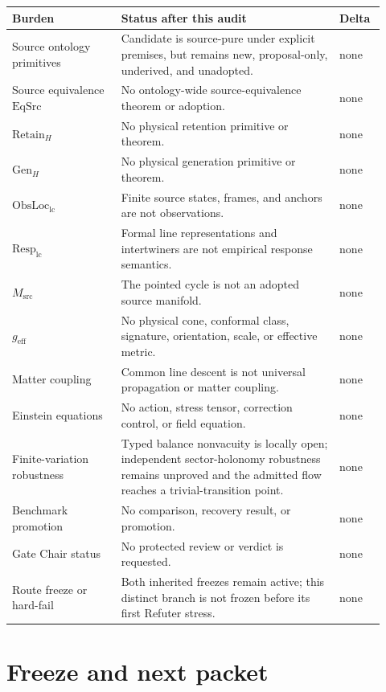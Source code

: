 \documentclass[11pt]{article}
\begin{document}
\small
\begin{longtable}{@{}p{0.27\linewidth}p{0.54\linewidth}p{0.11\linewidth}@{}}
\toprule
Burden & Status after this audit & Delta\\
\midrule
\endhead
Source ontology primitives & Candidate is source-pure under explicit premises, but remains new, proposal-only, underived, and unadopted. & none\\
Source equivalence $\mathrm{EqSrc}$ & No ontology-wide source-equivalence theorem or adoption. & none\\
$\mathrm{Retain}_H$ & No physical retention primitive or theorem. & none\\
$\mathrm{Gen}_H$ & No physical generation primitive or theorem. & none\\
$\mathrm{ObsLoc}_{\mathrm{lc}}$ & Finite source states, frames, and anchors are not observations. & none\\
$\mathrm{Resp}_{\mathrm{lc}}$ & Formal line representations and intertwiners are not empirical response semantics. & none\\
$M_{\mathrm{src}}$ & The pointed cycle is not an adopted source manifold. & none\\
$g_{\mathrm{eff}}$ & No physical cone, conformal class, signature, orientation, scale, or effective metric. & none\\
Matter coupling & Common line descent is not universal propagation or matter coupling. & none\\
Einstein equations & No action, stress tensor, correction control, or field equation. & none\\
Finite-variation robustness & Typed balance nonvacuity is locally open; independent sector-holonomy robustness remains unproved and the admitted flow reaches a trivial-transition point. & none\\
Benchmark promotion & No comparison, recovery result, or promotion. & none\\
Gate Chair status & No protected review or verdict is requested. & none\\
Route freeze or hard-fail & Both inherited freezes remain active; this distinct branch is not frozen before its first Refuter stress. & none\\
\bottomrule
\end{longtable}
\normalsize

\section{Freeze and next packet}
\end{document}
